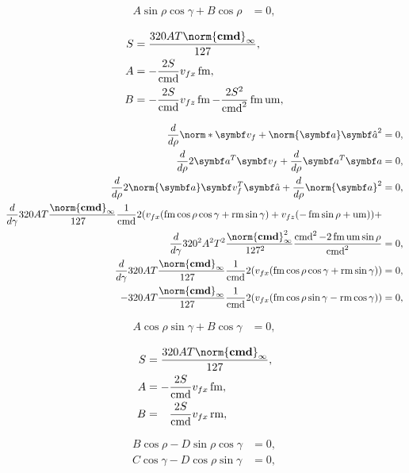 \begin{align*}
A\sin\rho\cos\gamma + B\cos\rho &= 0,
\end{align*}

\begin{align*}
S &= \frac{320AT\norm{\tvec{\cmd}}_{\infty}}{127},\\
A &= -\frac{2S}{\cmd}v_{fx}\fmove,\\
B &= -\frac{2S}{\cmd}v_{fz}\fmove - \frac{2S^2}{\cmd^2}\fmove\umove,
\end{align*}

\begin{align*}
\frac{\diff}{\diff\rho}\norm*{\vec{v}_f + \norm{\vec{a}}\uvec{a}}^2 &= 0,\\
\frac{\diff}{\diff\rho}2\vec{a}^T \vec{v}_f + \frac{\diff}{\diff\rho}\vec{a}^T \vec{a} &= 0,\\
\frac{\diff}{\diff\rho}2\norm{\vec{a}} \vec{v}_f^T \uvec{a} + \frac{\diff}{\diff\rho}\norm{\vec{a}}^2 &= 0,\\
\frac{\diff}{\diff\gamma}320AT\frac{\norm{\tvec{\cmd}}_{\infty}}{127\hphantom{_{\infty}}} \frac{1}{\cmd}2 (v_{fx}(\fmove \cos\rho\cos\gamma + \rmove \sin\gamma) + v_{fz}(-\fmove \sin\rho + \umove) ) +\\
\frac{\diff}{\diff\gamma}320^2 A^2 T^2\frac{\norm{\tvec{\cmd}}^2_{\infty}}{127^2\hphantom{_{\infty}}} \frac{\cmd^2  - 2\fmove\umove\sin\rho}{\cmd^2} &= 0,\\
%
\frac{\diff}{\diff\gamma}320AT\frac{\norm{\tvec{\cmd}}_{\infty}}{127\hphantom{_{\infty}}} \frac{1}{\cmd}2 (v_{fx}(\fmove \cos\rho\cos\gamma + \rmove \sin\gamma)) &= 0,\\
-320AT\frac{\norm{\tvec{\cmd}}_{\infty}}{127\hphantom{_{\infty}}} \frac{1}{\cmd}2 (v_{fx}(\fmove \cos\rho\sin\gamma - \rmove \cos\gamma)) &= 0,
\end{align*}

\begin{align*}
A\cos\rho\sin\gamma + B\cos\gamma &= 0,
\end{align*}

\begin{align*}
S &= \frac{320AT\norm{\tvec{\cmd}}_{\infty}}{127},\\
A &= -\frac{2S}{\cmd}v_{fx}\fmove,\\
B &= \hphantom{-}\frac{2S}{\cmd}v_{fx}\rmove,
\end{align*}

\begin{align*}
B\cos\rho - D\sin\rho\cos\gamma &= 0,\\
C\cos\gamma - D\cos\rho\sin\gamma &= 0,
\end{align*}


